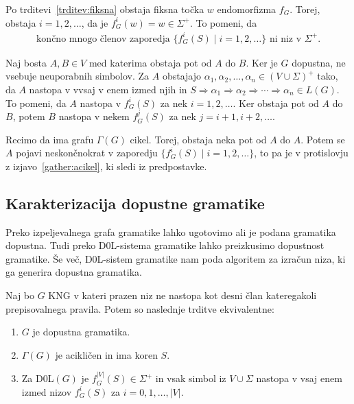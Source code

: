 \documentclass[fin1, tisk]{fmfdelo}
\providecommand{\abs}[1]{\left\lvert #1 \right\rvert}
\theoremstyle{definition}
\begin{document}
\begin{dokaz}
    Po trditevi~\ref{trditev:fiksna} obstaja fiksna točka $w$ endomorfizma $f_G$. Torej, obstaja
    $i = 1, 2, \ldots$, da je $f^i_G(w) = w \in \Sigma^+$. To pomeni, da 
    \begin{gather}\label{gather:acikel}
        \text{končno mnogo členov zaporedja } \{ f^i_G(S) \mid i = 1, 2, \ldots \} \text{ ni niz v }
        \Sigma^+.
    \end{gather}
    
    Naj bosta $A, B \in V$ med katerima obstaja pot od $A$ do $B$. Ker je $G$ dopustna, ne vsebuje
    neuporabnih simbolov. Za $A$ obstajajo $\alpha_1, \alpha_2, \ldots, \alpha_n \in (V \cup \Sigma)^+$ 
    tako, da $A$ nastopa v vvsaj v enem izmed njih in $S \Rightarrow \alpha_1 \Rightarrow 
    \alpha_2 \Rightarrow \cdots \Rightarrow \alpha_n \in L(G)$. To pomeni, da $A$ nastopa v
    $f^i_G(S)$ za nek $i = 1, 2, \ldots$. Ker obstaja pot od $A$ do $B$, potem $B$ nastopa v 
    nekem $f^j_G(S)$ za nek $j = i+1, i+2, \ldots$.

    Recimo da ima grafu $\Gamma(G)$ cikel. Torej, obstaja neka pot od $A$ do $A$. Potem se $A$
    pojavi neskončnokrat v zaporedju $\{ f^i_G(S) \mid i = 1, 2, \ldots \}$, to pa je v 
    protislovju z izjavo~\ref{gather:acikel}, ki sledi iz predpostavke.
\end{dokaz}

\subsection{Karakterizacija dopustne gramatike}

Preko izpeljevalnega grafa gramatike lahko ugotovimo ali je podana gramatika dopustna. Tudi preko
D$0$L-sistema gramatike lahko preizkusimo dopustnost gramatike. Še več, D$0$L-sistem gramatike
nam poda algoritem za izračun niza, ki ga generira dopustna gramatika.

\begin{izrek}\label{izrek:ekvivalence}
    Naj bo $G$ KNG v kateri prazen niz ne nastopa kot desni član 
    kateregakoli prepisovalnega pravila. Potem so naslednje trditve ekvivalentne:
    \begin{enumerate}
        \item $G$ je dopustna gramatika.
        \item $\Gamma(G)$ je acikličen in ima koren $S$.
        \item Za D0L$(G)$ je $ f_G^{\abs{V}}(S) \in \Sigma^+ $ in vsak simbol iz
        $ V \cup \Sigma $ nastopa v vsaj enem izmed nizov $f_G^i(S)$ za $i=0, 1, \ldots, \abs{V}$.
    \end{enumerate}
\end{izrek}
\end{document}

